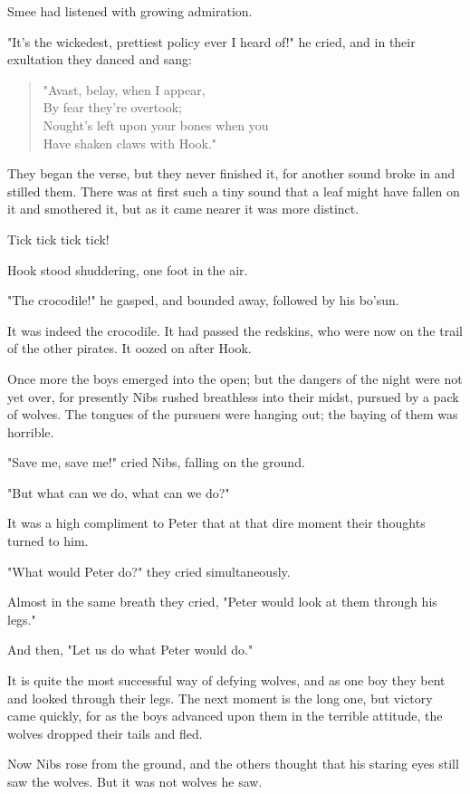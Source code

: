 Smee had listened with growing admiration.

"It's the wickedest, prettiest policy ever I heard of!\@" he cried,
and in their exultation they danced and sang:

\begin{verse}
	"Avast, belay, when I appear,\\
	By fear they're overtook;\\
	Nought's left upon your bones when you\\
	Have shaken claws with Hook."
\end{verse}

They began the verse, but they never finished it,
for another sound broke in and stilled them.
There was at first such a tiny sound that a leaf might have fallen on it and smothered it,
but as it came nearer it was more distinct.

Tick tick tick tick!

Hook stood shuddering, one foot in the air.

"The crocodile!\@" he gasped, and bounded away, followed by his bo'sun.

It was indeed the crocodile.
It had passed the redskins, who were now on the trail of the other pirates.
It oozed on after Hook.

Once more the boys emerged into the open;
but the dangers of the night were not yet over,
for presently Nibs rushed breathless into their midst, pursued by a pack of wolves.
The tongues of the pursuers were hanging out;
the baying of them was horrible.

"Save me, save me!\@" cried Nibs, falling on the ground.

"But what can we do, what can we do?"

It was a high compliment to Peter that at that dire moment their thoughts turned to him.

"What would Peter do?\@" they cried simultaneously.

Almost in the same breath they cried, "Peter would look at them through his legs."

And then, "Let us do what Peter would do."

It is quite the most successful way of defying wolves,
and as one boy they bent and looked through their legs.
The next moment is the long one, but victory came quickly,
for as the boys advanced upon them in the terrible attitude, the wolves dropped their tails and fled.

Now Nibs rose from the ground, and the others thought that his staring eyes still saw the wolves.
But it was not wolves he saw.

